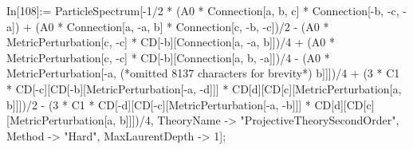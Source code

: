 In[108]:= ParticleSpectrum[-1/2 * (A0 * Connection[a, b, c] * Connection[-b, -c, -a]) + (A0 * Connection[a, -a, b] * Connection[c, -b, -c])/2 - (A0 * MetricPerturbation[c, -c] * CD[-b][Connection[a, -a, b]])/4 + (A0 * MetricPerturbation[c, -c] * CD[-b][Connection[a, b, -a]])/4 - (A0 * MetricPerturbation[-a, (*omitted 8137 characters for brevity*) b]]])/4 + (3 * C1 * CD[-c][CD[-b][MetricPerturbation[-a, -d]]] * CD[d][CD[c][MetricPerturbation[a, b]]])/2 - (3 * C1 * CD[-d][CD[-c][MetricPerturbation[-a, -b]]] * CD[d][CD[c][MetricPerturbation[a, b]]])/4, TheoryName -> "ProjectiveTheorySecondOrder", Method -> "Hard", MaxLaurentDepth -> 1];